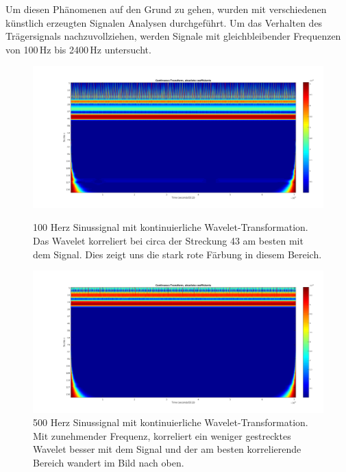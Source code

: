 \begin{refsection}
Um diesen Phänomenen auf den Grund zu gehen, wurden mit verschiedenen künstlich erzeugten Signalen Analysen durchgeführt.
Um das Verhalten des Trägersignals nachzuvollziehen, werden Signale mit gleichbleibender Frequenzen von 100\,Hz bis 2400\,Hz untersucht.
\begin{figure}
	\centering
	\includegraphics[width=0.9\linewidth]{papers/meteor/images/anomalie/beam/cwt_0100hz.png}
	\caption{100 Herz Sinussignal mit kontinuierliche Wavelet-Transformation.
	Das Wavelet korreliert bei circa der Streckung 43 am besten mit dem Signal. 
	Dies zeigt uns die stark rote Färbung in diesem Bereich.}
	\includegraphics[width=0.9\linewidth]{papers/meteor/images/anomalie/beam/cwt_0500hz.png}
	\caption{500 Herz Sinussignal mit kontinuierliche Wavelet-Transformation.
	Mit zunehmender Frequenz, korreliert ein weniger gestrecktes Wavelet besser mit dem Signal und der am besten korrelierende Bereich wandert im Bild nach oben. }
	\label{fig:cwt_anomalie_beam_1}
\end{figure}


\end{refsection}
